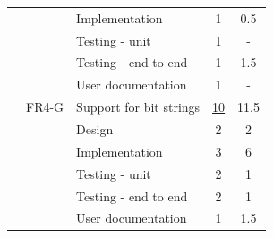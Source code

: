 \begin{table}[!ht]
\begin{tabularx}{\textwidth}{l l X c c}
	   &  & Implementation			   	& 1 & 0.5\\
	   &  & Testing - unit				   	& 1 & -\\
	   &  & Testing - end to end			& 1 & 1.5\\
	   &  & User documentation		   	& 1 & -\\
	\addlinespace
	6 & FR4-G & Support for bit strings & \underline{ 10 } & 11.5 \\
	   &  & Design				   	& 2 & 2\\	   
	   &  & Implementation			   	& 3 & 6\\
	   &  & Testing - unit				   	& 2 & 1\\
	   &  & Testing - end to end			& 2 & 1\\
	   &  & User documentation		   	& 1 & 1.5\\
	\bottomrule
\end{tabularx}
\end{table}

